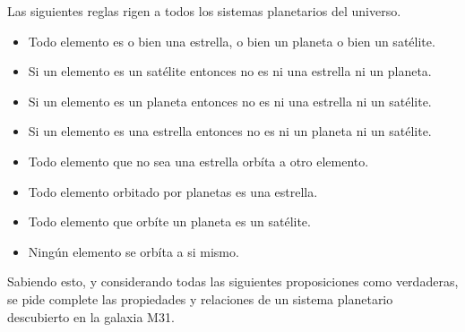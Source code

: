\documentclass[12pt, addpoints]{../../common/epyl_exam_template}
\begin{document}
\begin{questions}

  \question
    Las siguientes reglas rigen a todos los sistemas planetarios del universo.

    \begin{itemize}
      \item Todo elemento es o bien una estrella, o bien un planeta o bien un satélite.
      \item Si un elemento es un satélite entonces no es ni una estrella ni un planeta.
      \item Si un elemento es un planeta entonces no es ni una estrella ni un satélite.
      \item Si un elemento es una estrella entonces no es ni un planeta ni un satélite.
      \item Todo elemento que no sea una estrella orbíta a otro elemento.
      \item Todo elemento orbitado por planetas es una estrella.
      \item Todo elemento que orbíte un planeta es un satélite.
      \item Ningún elemento se orbíta a si mismo.
    \end{itemize}

    Sabiendo esto, y considerando todas las siguientes proposiciones como verdaderas,
    se pide complete las propiedades y relaciones de un sistema planetario descubierto
    en la galaxia M31.


\end{questions}
\end{document}
